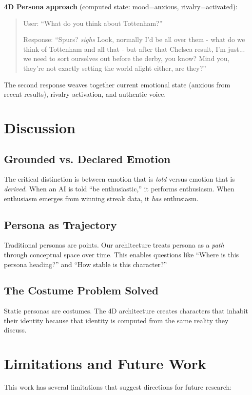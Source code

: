 \documentclass[11pt]{article}
\begin{document}
\textbf{4D Persona approach} (computed state: mood=anxious, rivalry=activated):
\begin{quote}
User: ``What do you think about Tottenham?''

Response: ``Spurs? \textit{sighs} Look, normally I'd be all over them - what do we think of Tottenham and all that - but after that Chelsea result, I'm just... we need to sort ourselves out before the derby, you know? Mind you, they're not exactly setting the world alight either, are they?''
\end{quote}

The second response weaves together current emotional state (anxious from recent results), rivalry activation, and authentic voice.

\section{Discussion}

\subsection{Grounded vs. Declared Emotion}
The critical distinction is between emotion that is \textit{told} versus emotion that is \textit{derived}. When an AI is told ``be enthusiastic,'' it performs enthusiasm. When enthusiasm emerges from winning streak data, it \textit{has} enthusiasm.

\subsection{Persona as Trajectory}
Traditional personas are points. Our architecture treats persona as a \textit{path} through conceptual space over time. This enables questions like ``Where is this persona heading?'' and ``How stable is this character?''

\subsection{The Costume Problem Solved}
Static personas are costumes. The 4D architecture creates characters that inhabit their identity because that identity is computed from the same reality they discuss.

\section{Limitations and Future Work}

This work has several limitations that suggest directions for future research:
\end{document}
